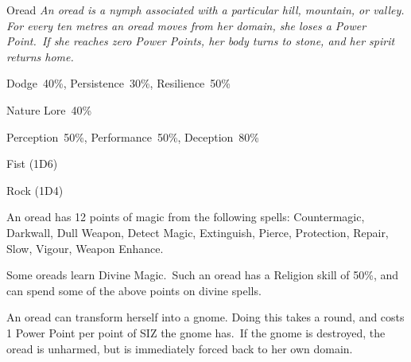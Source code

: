 \begin{monsterbox}{Oread}
	\textit{An oread is a nymph associated with a particular hill, mountain, or valley. For every ten metres an oread moves from her domain, she loses a Power Point. If she reaches zero Power Points, her body turns to stone, and her spirit returns home.}\\
	\rpghline
	\basics[%
        hitpoints  = 11, 
	majorwound = 6,
	damagemodifier = 0,
	powerpoints = 25,
	movementrate = 15m,
	armor = None,
	plunderrating = 1
	]
	\rpghline%
	\stats[ %
		STR = 2D6    (7),
		CON = 3D6+3  (12),
		DEX = 3D6+6  (17),
		SIZ = 2D6+3  (10),
		INT = 3D6+3  (14),
		POW = 2D6+15 (22),
		CHA = 2D6+9  (15)
	]
	\rpghline%
	\begin{rpg-monsteraction}[Resistances]
		Dodge~40\%, Persistence~30\%, Resilience~50\%
	\end{rpg-monsteraction}
	\begin{rpg-monsteraction}[Knowledge]
		Nature Lore~40\%
	\end{rpg-monsteraction}
	\begin{rpg-monsteraction}[Practical]
		Perception~50\%, Performance~50\%, Deception~80\%
	\end{rpg-monsteraction}
	\begin{rpg-monsteraction}
		Fist (1D6)
	\end{rpg-monsteraction}
	\begin{rpg-monsteraction}
		Rock (1D4)
	\end{rpg-monsteraction}
	\begin{rpg-monsteraction}[Magic 70\%]
		An oread has 12 points of magic from the following spells: Countermagic, Darkwall, Dull Weapon, Detect Magic, Extinguish, Pierce, Protection, Repair, Slow, Vigour, Weapon Enhance.
	\end{rpg-monsteraction}
	\begin{rpg-monsteraction}
		Some oreads learn Divine Magic. Such an oread has a Religion skill of 50\%, and can spend some of the above points on divine spells.
	\end{rpg-monsteraction}
	\begin{rpg-monsteraction}
		An oread can transform herself into a gnome. Doing this takes a round, and costs 1 Power Point per point of SIZ the gnome has. If the gnome is destroyed, the oread is unharmed, but is immediately forced back to her own domain.
	\end{rpg-monsteraction}

\end{monsterbox}


